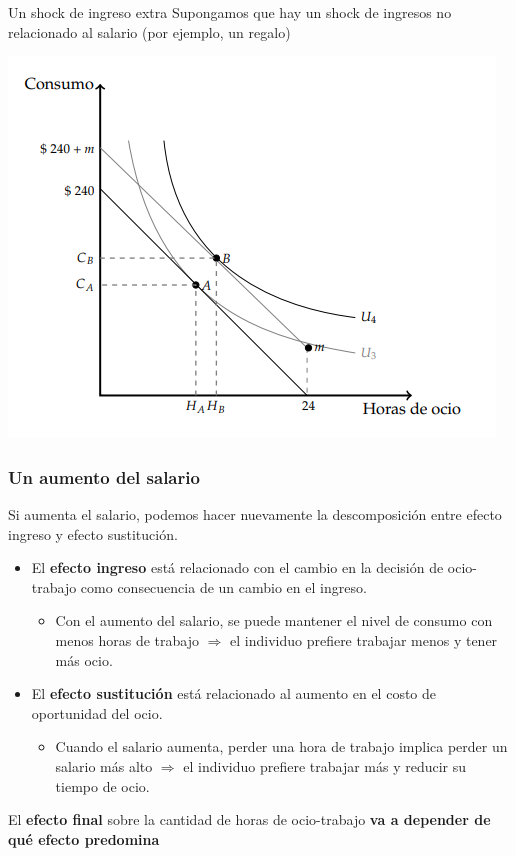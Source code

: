 \documentclass{beamer}
\begin{document}
\begin{frame}{Un shock de ingreso extra}
    Supongamos que hay un shock de ingresos no relacionado al salario (por ejemplo, un regalo)
    \begin{center}
        \includegraphics[scale=0.9]{../Figures/C9.7.png}
    \end{center}
\end{frame}

\begin{frame}
    \frametitle{Un aumento del salario}
    Si aumenta el salario, podemos hacer nuevamente la descomposición entre efecto ingreso y efecto sustitución. \vspace{2mm} \pause
  \begin{itemize}  
        \item El \textbf{efecto ingreso} está relacionado con el cambio en la decisión de ocio- trabajo como consecuencia de un cambio en el ingreso. 
        \begin{itemize}
        \item Con el aumento del salario, se puede mantener el nivel de consumo con menos horas de trabajo $\Rightarrow$ el individuo prefiere trabajar menos y tener más ocio. \vspace{2mm} \pause
        \end{itemize}
        \item El \textbf{efecto sustitución} está relacionado al aumento en el costo de oportunidad del ocio. 
        \begin{itemize}
        \item Cuando el salario aumenta, perder una hora de trabajo implica perder un salario más alto $\Rightarrow$ el individuo prefiere trabajar más y reducir su tiempo de ocio. \pause
        \end{itemize}
        \end{itemize}
    \begin{boxB}
        \centering El \textbf{efecto final} sobre la cantidad de horas de ocio-trabajo \textbf{va a depender de qué efecto predomina}
    \end{boxB}
\end{frame}
\end{document}
